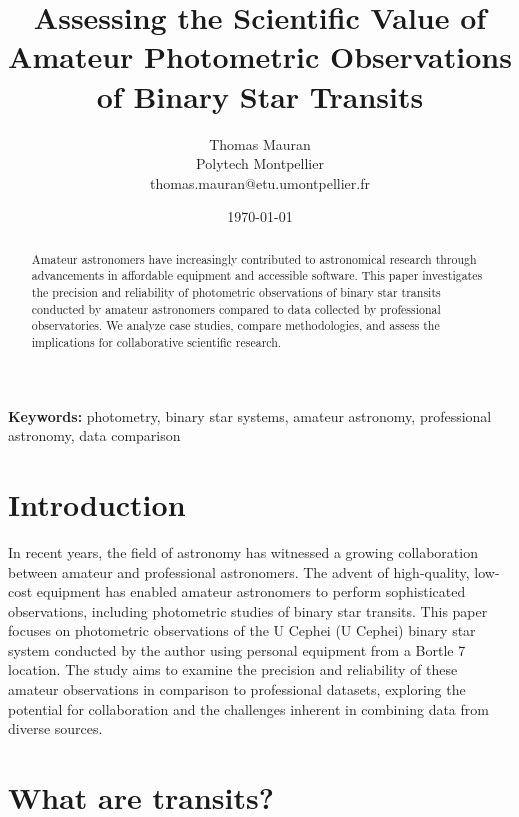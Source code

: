 \documentclass[12pt,a4paper]{article}
\title{Assessing the Scientific Value of Amateur Photometric Observations of Binary Star Transits}
\author{Thomas Mauran \\\small Polytech Montpellier  \\\small thomas.mauran@etu.umontpellier.fr}
\date{\today}
\begin{document}
\maketitle

\begin{abstract}
Amateur astronomers have increasingly contributed to astronomical research through advancements in affordable equipment and accessible software. This paper investigates the precision and reliability of photometric observations of binary star transits conducted by amateur astronomers compared to data collected by professional observatories. We analyze case studies, compare methodologies, and assess the implications for collaborative scientific research.
\end{abstract}

\textbf{Keywords:} photometry, binary star systems, amateur astronomy, professional astronomy, data comparison

\newpage

\tableofcontents

\newpage

\section{Introduction}
In recent years, the field of astronomy has witnessed a growing collaboration between amateur 
and professional astronomers. The advent of high-quality, low-cost equipment has enabled 
amateur astronomers to perform sophisticated observations, including photometric studies of 
binary star transits. This paper focuses on photometric observations of the U Cephei 
(U Cephei) binary star system conducted by the author using personal equipment from a 
Bortle 7 location. The study aims to examine the precision and reliability of these amateur 
observations in comparison to professional datasets, exploring the potential for collaboration
and the challenges inherent in combining data from diverse sources.

\section{What are transits?}
\end{document}
